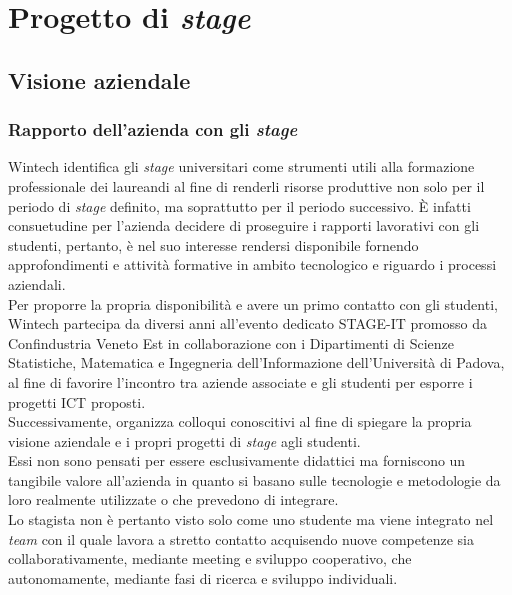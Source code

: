\chapter{Progetto di \emph{stage}}
\label{cap:progettoDiStage}

\section{Visione aziendale}
\subsection{Rapporto dell'azienda con gli \emph{stage}}
Wintech identifica gli \emph{stage} universitari come strumenti utili alla formazione professionale dei laureandi al fine di renderli risorse produttive non solo per il periodo di \emph{stage} definito, ma soprattutto per il periodo successivo. È infatti consuetudine per l'azienda decidere di proseguire i rapporti lavorativi con gli studenti, pertanto, è nel suo interesse rendersi disponibile fornendo approfondimenti e attività formative in ambito tecnologico e riguardo i processi aziendali.\\
Per proporre la propria disponibilità e avere un primo contatto con gli studenti, Wintech partecipa da diversi anni all'evento dedicato STAGE-IT promosso da Confindustria Veneto Est in collaborazione con i Dipartimenti di Scienze Statistiche, Matematica e Ingegneria dell'Informazione dell'Università di Padova, al fine di favorire l'incontro tra aziende associate e gli studenti per esporre i progetti \gls{ICT} proposti.\\
Successivamente, organizza colloqui conoscitivi al fine di spiegare la propria visione aziendale e i propri progetti di \emph{stage} agli studenti.\\
Essi non sono pensati per essere esclusivamente didattici ma forniscono un tangibile valore all'azienda in quanto si basano sulle tecnologie e metodologie da loro realmente utilizzate o che prevedono di integrare.\\
Lo stagista non è pertanto visto solo come uno studente ma viene integrato nel \emph{team} con il quale lavora a stretto contatto acquisendo nuove competenze sia collaborativamente, mediante meeting e sviluppo cooperativo, che autonomamente, mediante fasi di ricerca e sviluppo individuali.\\

